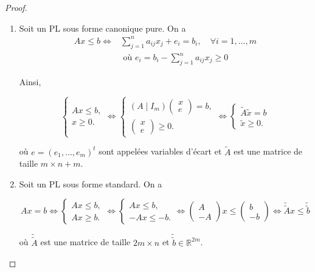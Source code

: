 \documentclass[a4paper,12pt,openany]{book}
\theoremstyle{plain}
\theoremstyle{definition}
\theoremstyle{remark}
\theoremstyle{nbstyle}
\begin{document}
	\begin{proof}
		\begin{enumerate}
			\item Soit un PL sous forme canonique pure. On a
			$$
			\begin{aligned}
			A x \leq b \Longleftrightarrow & \displaystyle\sum_{j=1}^{n} a_{i j} x_{j}+e_{i}=b_{i}, \quad \forall i=1, \ldots, m \\
			& \text { où } e_{i}=b_{i}-\displaystyle\sum_{j=1}^{n} a_{i j} x_{j} \geq 0
			\end{aligned}
			$$
			
			Ainsi,
			
			$$
			\left\{\begin{array}{r} 
			A x \leq b , \\
			x \geq 0 .
			\end{array} \Leftrightarrow \left\{\begin{array}{r} 
			(A \mid I_{m}) \begin{pmatrix} x \\ e \end{pmatrix} = b , \\
			\begin{pmatrix} x \\ e \end{pmatrix} \geq 0 .
			\end{array} \Leftrightarrow \left\{\begin{array}{r}
			\tilde{A} \tilde{x}=b \\
			\tilde{x} \geq 0 .
			\end{array}\right.\right.\right.
			$$
			
			où $e=(e_{1}, \ldots, e_{m})^{t}$ sont appelées variables d'écart et $\tilde{A}$ est une matrice de taille $m \times n+m$.\\
			\item  Soit un PL sous forme standard. On a
			
			$$
			A x=b \Longleftrightarrow\left\{\begin{array}{c} 
			A x \leq b , \\
			A x \geq b .
			\end{array} \Longleftrightarrow \left\{\begin{array}{c}
			A x \leq b, \\
			-A x \leq-b .
			\end{array} \Longleftrightarrow\begin{pmatrix} A \\ -A \end{pmatrix} x \leq\begin{pmatrix} b \\ -b \end{pmatrix} \Longleftrightarrow \tilde{\tilde{A}} x \leq \tilde{\tilde{b}}\right.\right.
			$$
			
			où $\tilde{\tilde{A}}$ est une matrice de taille $2 m \times n$ et $\tilde{\tilde{b}} \in \mathbb{R}^{2 m}$.
		\end{enumerate}
	\end{proof}
	
\end{document}
